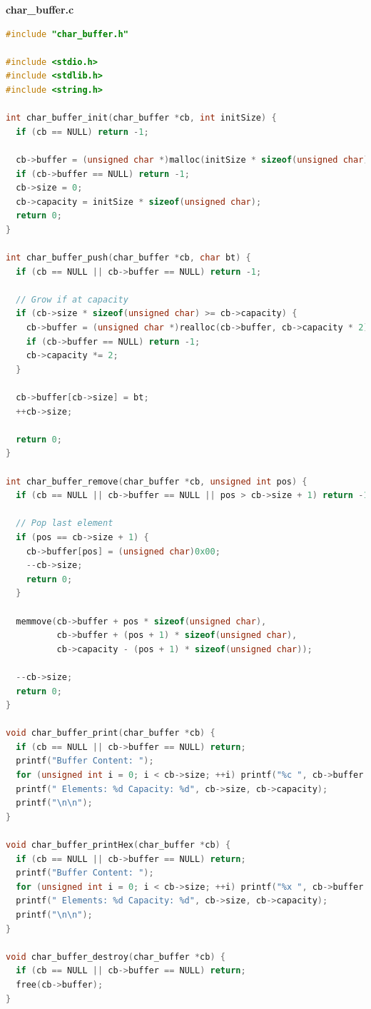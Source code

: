 \documentclass[11pt]{article}
\begin{document}
\newpage
\thispagestyle{fancy}
\fancyhf{}
\fancyfoot[R]{\thepage}
\renewcommand*{\footrulewidth}{1pt}
\textbf{char\_buffer.c}
\begin{lstlisting}[language=C]
#include "char_buffer.h"

#include <stdio.h>
#include <stdlib.h>
#include <string.h>

int char_buffer_init(char_buffer *cb, int initSize) {
  if (cb == NULL) return -1;

  cb->buffer = (unsigned char *)malloc(initSize * sizeof(unsigned char));
  if (cb->buffer == NULL) return -1;
  cb->size = 0;
  cb->capacity = initSize * sizeof(unsigned char);
  return 0;
}

int char_buffer_push(char_buffer *cb, char bt) {
  if (cb == NULL || cb->buffer == NULL) return -1;

  // Grow if at capacity
  if (cb->size * sizeof(unsigned char) >= cb->capacity) {
    cb->buffer = (unsigned char *)realloc(cb->buffer, cb->capacity * 2);
    if (cb->buffer == NULL) return -1;
    cb->capacity *= 2;
  }

  cb->buffer[cb->size] = bt;
  ++cb->size;

  return 0;
}

int char_buffer_remove(char_buffer *cb, unsigned int pos) {
  if (cb == NULL || cb->buffer == NULL || pos > cb->size + 1) return -1;

  // Pop last element
  if (pos == cb->size + 1) {
    cb->buffer[pos] = (unsigned char)0x00;
    --cb->size;
    return 0;
  }

  memmove(cb->buffer + pos * sizeof(unsigned char),
          cb->buffer + (pos + 1) * sizeof(unsigned char),
          cb->capacity - (pos + 1) * sizeof(unsigned char));

  --cb->size;
  return 0;
}

void char_buffer_print(char_buffer *cb) {
  if (cb == NULL || cb->buffer == NULL) return;
  printf("Buffer Content: ");
  for (unsigned int i = 0; i < cb->size; ++i) printf("%c ", cb->buffer[i]);
  printf(" Elements: %d Capacity: %d", cb->size, cb->capacity);
  printf("\n\n");
}

void char_buffer_printHex(char_buffer *cb) {
  if (cb == NULL || cb->buffer == NULL) return;
  printf("Buffer Content: ");
  for (unsigned int i = 0; i < cb->size; ++i) printf("%x ", cb->buffer[i]);
  printf(" Elements: %d Capacity: %d", cb->size, cb->capacity);
  printf("\n\n");
}

void char_buffer_destroy(char_buffer *cb) {
  if (cb == NULL || cb->buffer == NULL) return;
  free(cb->buffer);
}


\end{lstlisting}
\end{document}

